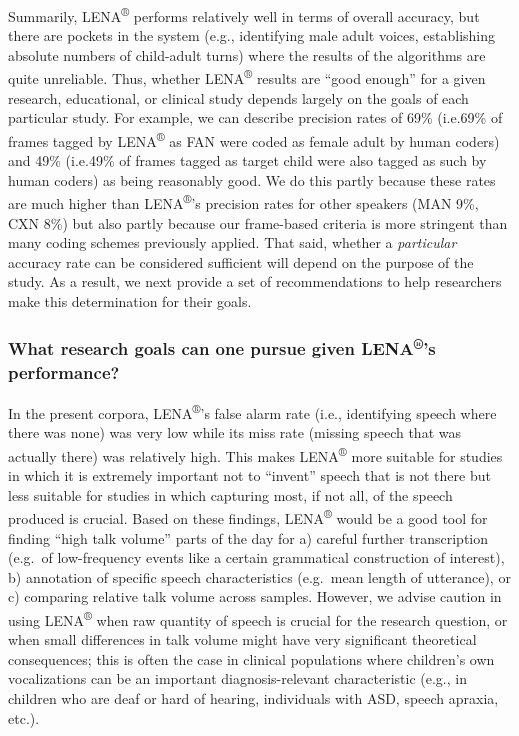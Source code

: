 \documentclass[english,floatsintext,man]{apa6}
\begin{document}
Summarily, LENA\textsuperscript{®} performs relatively well in terms of
overall accuracy, but there are pockets in the system (e.g., identifying
male adult voices, establishing absolute numbers of child-adult turns)
where the results of the algorithms are quite unreliable. Thus, whether
LENA\textsuperscript{®} results are \enquote{good enough} for a given
research, educational, or clinical study depends largely on the goals of
each particular study. For example, we can describe precision rates of
69\% (i.e.69\% of frames tagged by LENA\textsuperscript{®} as FAN were
coded as female adult by human coders) and 49\% (i.e.49\% of frames
tagged as target child were also tagged as such by human coders) as
being reasonably good. We do this partly because these rates are much
higher than LENA\textsuperscript{®}'s precision rates for other speakers
(MAN 9\%, CXN 8\%) but also partly because our frame-based criteria is
more stringent than many coding schemes previously applied. That said,
whether a \emph{particular} accuracy rate can be considered sufficient
will depend on the purpose of the study. As a result, we next provide a
set of recommendations to help researchers make this determination for
their goals.

\subsubsection{\texorpdfstring{What research goals can one pursue given
LENA\textsuperscript{®}'s
performance?}{What research goals can one pursue given LENA®'s performance?}}\label{what-research-goals-can-one-pursue-given-lenas-performance}

In the present corpora, LENA\textsuperscript{®}'s false alarm rate
(i.e., identifying speech where there was none) was very low while its
miss rate (missing speech that was actually there) was relatively high.
This makes LENA\textsuperscript{®} more suitable for studies in which it
is extremely important not to \enquote{invent} speech that is not there
but less suitable for studies in which capturing most, if not all, of
the speech produced is crucial. Based on these findings,
LENA\textsuperscript{®} would be a good tool for finding \enquote{high
talk volume} parts of the day for a) careful further transcription
(e.g.~of low-frequency events like a certain grammatical construction of
interest), b) annotation of specific speech characteristics (e.g.~mean
length of utterance), or c) comparing relative talk volume across
samples. However, we advise caution in using LENA\textsuperscript{®}
when raw quantity of speech is crucial for the research question, or
when small differences in talk volume might have very significant
theoretical consequences; this is often the case in clinical populations
where children's own vocalizations can be an important
diagnosis-relevant characteristic (e.g., in children who are deaf or
hard of hearing, individuals with ASD, speech apraxia, etc.).
\end{document}
